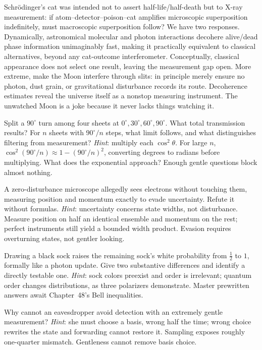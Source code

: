 
\begin{thought}
Schrödinger's cat was intended not to assert half-life/half-death but to X-ray measurement: if atom--detector--poison--cat amplifies microscopic superposition indefinitely, must macroscopic superposition follow? We have two responses. Dynamically, astronomical molecular and photon interactions decohere alive/dead phase information unimaginably fast, making it practically equivalent to classical alternatives, beyond any cat-outcome interferometer. Conceptually, classical appearance does not select one result, leaving the measurement gap open. More extreme, make the Moon interfere through slits: in principle merely ensure no photon, dust grain, or gravitational disturbance records its route. Decoherence estimates reveal the universe itself as a nonstop measuring instrument. The unwatched Moon is a joke because it never lacks things watching it.
\end{thought}

\begin{puzzles}
\item Split a $90^\circ$ turn among four sheets at $0^\circ,30^\circ,60^\circ,90^\circ$. What total transmission results? For $n$ sheets with $90^\circ/n$ steps, what limit follows, and what distinguishes filtering from measurement? \emph{Hint}: multiply each $\cos^2\theta$. For large $n$, $\cos^2(90^\circ/n)\approx1-(90^\circ/n)^2$, converting degrees to radians before multiplying. What does the exponential approach? Enough gentle questions block almost nothing.
\item A zero-disturbance microscope allegedly sees electrons without touching them, measuring position and momentum exactly to evade uncertainty. Refute it without formulas. \emph{Hint}: uncertainty concerns state widths, not disturbance. Measure position on half an identical ensemble and momentum on the rest; perfect instruments still yield a bounded width product. Evasion requires overturning states, not gentler looking.
\item Drawing a black sock raises the remaining sock's white probability from $\tfrac12$ to $1$, formally like a photon update. Give two substantive differences and identify a directly testable one. \emph{Hint}: sock colors preexist and order is irrelevant; quantum order changes distributions, as three polarizers demonstrate. Master prewritten answers await Chapter~48's Bell inequalities.
\item Why cannot an eavesdropper avoid detection with an extremely gentle measurement? \emph{Hint}: she must choose a basis, wrong half the time; wrong choice rewrites the state and forwarding cannot restore it. Sampling exposes roughly one-quarter mismatch. Gentleness cannot remove basis choice.
\end{puzzles}

